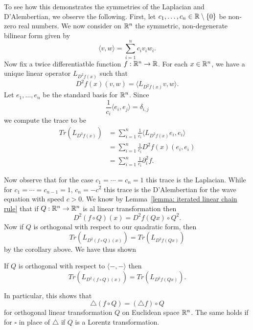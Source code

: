 \documentclass[twoside, a4paper, 10pt]{amsart}
\begin{document}
To see how this demonstrates the symmetries of the Laplacian and D'Alembertian, we observe the following. First, let $c_1, \ldots, c_n \in \mathbb{R} \setminus \{0\}$ be non-zero real numbers. We now consider on $\mathbb{R}^n$ the symmetric, non-degenerate bilinear form given by $$\langle v, w \rangle = \sum_{i=1}^n c_i v_i w_i. $$ Now fix a twice differentiatble function $f:\mathbb{R}^n \to \mathbb{R}$. For each $x \in \mathbb{R}^n$, we have a unique linear operator $L_{D^2f(x)}$ such that $$D^2f(x) (v,w) = \langle L_{D^2f(x)}v, w \rangle.$$ Let $e_1, \ldots, e_n$ be the standard basis for $\mathbb{R}^n$. Since $$\frac{1}{c_i} \langle e_i, e_j \rangle = \delta_{i,j}$$ we compute the trace to be \begin{align*} Tr(L_{D^2f(x)}) &= \sum_{i=1}^n \frac{1}{c_i} \langle L_{D^2f(x)}e_i, e_i \rangle  \\ & = \sum_{i=1}^n \frac{1}{c_i} D^2f(x)(e_i,e_i) \\ & = \sum_{i=1}^n \frac{1}{c_i} \partial_i^2 f. \end{align*}

Now observe that for the case $c_1 = \cdots = c_n = 1$ this trace is the Laplacian. While for $c_1 = \cdots = c_{n-1} = 1$, $c_n = -c^2$ this trace is the D'Alembertian for the wave equation with speed $c>0$. We know by Lemma~\ref{lemma: iterated linear chain rule} that if $Q:\mathbb{R}^n \to \mathbb{R}^n$ is al linear transformation then $$D^2(f \circ Q)(x) = D^2f(Qx) \circ Q^2.$$ Now if $Q$ is orthogonal with respect to our quadratic form, then $$Tr(L_{D^2(f \circ Q) (x)}) = Tr(L_{D^2f(Qx)})$$ by the corollary above. We have thus shown

\begin{thm} If $Q$ is orthogonal with respect to $\langle -, - \rangle$ then $$Tr(L_{D^2(f \circ Q)(x)}) = Tr(L_{D^2f(Qx)}).$$

\end{thm}

In particular, this shows that $$\triangle (f \circ Q) = (\triangle f) \circ Q$$ for orthogonal linear transformation $Q$ on Euclidean space $\mathbb{R}^n$. The same holds if for $\square$ in place of $\triangle$ if $Q$ is a Lorentz transformation.

\end{document}
